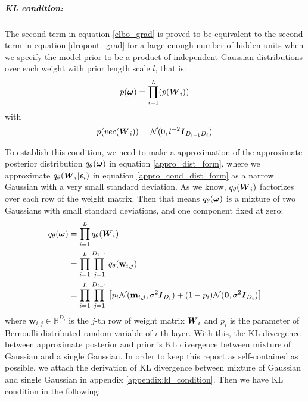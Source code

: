 \subparagraph{KL condition:} The second term in equation \ref{elbo_grad} is proved to be equivalent to the second term in equation \ref{dropout_grad}
for a large enough number of hidden units when we specify the model prior to be a product of independent Gaussian distributions over each weight with prior length scale $l$, that is:
\[p(\boldsymbol \omega) = \prod_{i=1}^{L}(p(\boldsymbol W_{i})) \]
with
\[
p(vec(\boldsymbol W_{i})) = \mathcal N(0, l^{-2}\boldsymbol I_{D_{i-1} D_{i}})
\]

To establish this condition, we need to make a approximation of the approximate posterior distribution $q_{\theta}(\boldsymbol \omega)$ in equation \ref{appro_dist_form}, where we approximate $q_{\theta}(\boldsymbol W_{i}|\boldsymbol \epsilon_{i})$ in equation \ref{appro_cond_dist_form} as a narrow Gaussian with a very small standard deviation. As we know, $q_{\theta}(\boldsymbol W_{i})$ factorizes over each row of the weight matrix. Then that means $q_{\theta}(\boldsymbol \omega)$ is a mixture of two Gaussians with small standard deviations, and one component fixed at zero:
\begin{equation}\label{appro_dist_guassian}
\begin{aligned}
q_{\theta}(\boldsymbol \omega) &= \prod_{i=1}^{L}q_{\theta}(\boldsymbol W_{i}) \\
&=\prod_{i=1}^{L}\prod_{j=1}^{D_{i-1}}q_{\theta}(\textbf{w}_{i,j}) \\
&= \prod_{i=1}^{L}\prod_{j=1}^{D_{i-1}} \big[ p_{i} \mathcal N(\textbf{m}_{i,j},\sigma^{2} \boldsymbol I_{D_{i}}) + (1-p_{i})\mathcal N(\boldsymbol 0, \sigma^{2} \boldsymbol I_{D_{i}})\big]
\end{aligned}
\end{equation}
where $\textbf{w}_{i,j} \in \mathbb R^{D_{i}}$ is the $j$-th row of weight matrix $\boldsymbol W_{i}$ and $p_{i}$ is the parameter of Bernoulli distributed random variable of $i$-th layer. With this, the KL divergence between approximate posterior and prior is KL divergence between mixture of Gaussian and a single Gaussian. In order to keep this report as self-contained as possible, we attach the derivation of KL divergence between mixture of Gaussian and single Gaussian in appendix \ref{appendix:kl_condition}. Then we have KL condition in the following:


